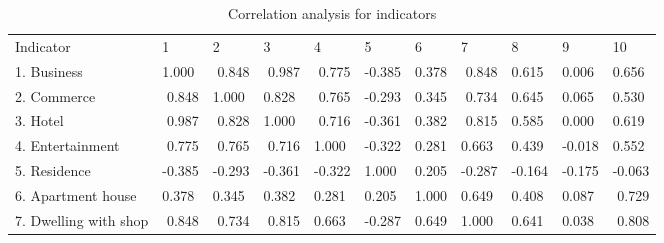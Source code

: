 %
\begin{sidewaystable}[htbp]
	\centering
	\caption{Correlation analysis for indicators}
	\label{tab:chp3:CorrelationAnalysis}
	\small
	\renewcommand{\arraystretch}{1.5} %
	\begin{tabular}{p{9em}|p{3em}<{\raggedleft}|p{3em}<{\raggedleft}|p{3em}<{\raggedleft}|p{3em}<{\raggedleft}|p{3em}<{\raggedleft}|p{3em}<{\raggedleft}|p{3em}<{\raggedleft}|p{3em}<{\raggedleft}|p{3em}<{\raggedleft}|p{3em}<{\raggedleft}}
		\Xhline{1.5pt}
		Indicator & 1 & 2 & 3 & 4 & 5 & 6 & 7 & 8 & 9 & 10 \\
		
		\Xhline{0.5pt}
		1. Business & 1.000 & \multicolumn{1}{r|}{\cellcolor[rgb]{ 0.8, 0.8, 0.8} 0.848} & \multicolumn{1}{r|}{\cellcolor[rgb]{ 0.8, 0.8, 0.8} 0.987} & \multicolumn{1}{r|}{\cellcolor[rgb]{ 0.8, 0.8, 0.8} 0.775} & -0.385 & 0.378  & \multicolumn{1}{r|}{\cellcolor[rgb]{ 0.8, 0.8, 0.8} 0.848} & 0.615  & 0.006  & 0.656 \\
		
		2. Commerce & \multicolumn{1}{r|}{\cellcolor[rgb]{ 0.8, 0.8, 0.8} 0.848} & 1.000 & 0.828  & \multicolumn{1}{r|}{\cellcolor[rgb]{ 0.8, 0.8, 0.8} 0.765} & -0.293 & 0.345  & \multicolumn{1}{r|}{\cellcolor[rgb]{ 0.8, 0.8, 0.8} 0.734} & 0.645  & 0.065  & 0.530 \\
		
		3. Hotel & \multicolumn{1}{r|}{\cellcolor[rgb]{ 0.8, 0.8, 0.8} 0.987} & \multicolumn{1}{r|}{\cellcolor[rgb]{ 0.8, 0.8, 0.8} 0.828} & 1.000 & \multicolumn{1}{r|}{\cellcolor[rgb]{ 0.8, 0.8, 0.8} 0.716} & -0.361 & 0.382  & \multicolumn{1}{r|}{\cellcolor[rgb]{ 0.8, 0.8, 0.8} 0.815} & 0.585  & 0.000  & 0.619 \\
		
		4. Entertainment & \multicolumn{1}{r|}{\cellcolor[rgb]{ 0.8, 0.8, 0.8} 0.775} & \multicolumn{1}{r|}{\cellcolor[rgb]{ 0.8, 0.8, 0.8} 0.765} & \multicolumn{1}{r|}{\cellcolor[rgb]{ 0.8, 0.8, 0.8} 0.716} & 1.000 & -0.322 & 0.281  & 0.663  & 0.439  & -0.018 & 0.552 \\
		
		5. Residence & -0.385 & -0.293 & -0.361 & -0.322 & 1.000 & 0.205  & -0.287 & -0.164 & -0.175 & -0.063 \\
		
		6. Apartment house & 0.378  & 0.345  & 0.382  & 0.281  & 0.205  & 1.000 & 0.649  & 0.408  &0.087  & \multicolumn{1}{r}{\cellcolor[rgb]{ 0.8, 0.8, 0.8} 0.729} \\
		
		7. Dwelling with shop & \multicolumn{1}{r|}{\cellcolor[rgb]{ 0.8, 0.8, 0.8} 0.848} & \multicolumn{1}{r|}{\cellcolor[rgb]{ 0.8, 0.8, 0.8} 0.734} & \multicolumn{1}{r|}{\cellcolor[rgb]{ 0.8, 0.8, 0.8} 0.815} & 0.663  & -0.287 & 0.649  & 1.000 & 0.641  & 0.038  & \multicolumn{1}{r}{\cellcolor[rgb]{ 0.8, 0.8, 0.8} 0.808} \\
		

\end{tabular}
\end{sidewaystable}
